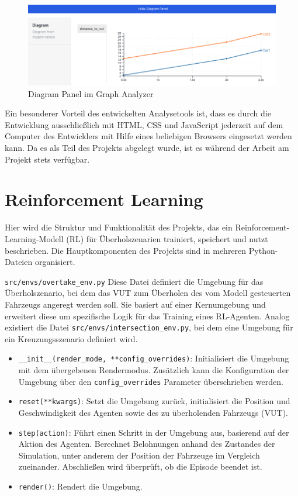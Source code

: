 \begin{figure}[htb]
    \centering
    \includegraphics[width=\textwidth]{contents/figures/diagram_panel.png}
    \caption{Diagram Panel im Graph Analyzer}
    \label{fig:analyzer_diagram_panel}
\end{figure}

Ein besonderer Vorteil des entwickelten Analysetools ist, dass es durch die Entwicklung ausschließlich mit HTML, CSS und JavaScript jederzeit auf dem Computer des Entwicklers mit Hilfe eines beliebigen Browsers eingesetzt werden kann. Da es als Teil des Projekts abgelegt wurde, ist es während der Arbeit am Projekt stets verfügbar.

\section{Reinforcement Learning}
Hier wird die Struktur und Funktionalität des Projekts, das ein Reinforcement-Learning-Modell (RL) für Überholszenarien trainiert, speichert und nutzt beschrieben. Die Hauptkomponenten des Projekts sind in mehreren Python-Dateien organisiert.

\texttt{src/envs/overtake\_env.py}
Diese Datei definiert die Umgebung für das Überholszenario, bei dem das VUT zum Überholen des vom Modell gesteuerten Fahrzeugs angeregt werden soll. Sie basiert auf einer Kernumgebung und erweitert diese um spezifische Logik für das Training eines RL-Agenten.
Analog existiert die Datei \texttt{src/envs/intersection\_env.py}, bei dem eine Umgebung für ein Kreuzungsszenario definiert wird.

\begin{itemize}
    \item \texttt{\_\_init\_\_(render\_mode, **config\_overrides)}: Initialisiert die Umgebung mit dem übergebenen Rendermodus. Zusätzlich kann die Konfiguration der Umgebung über den \texttt{config\_overrides} Parameter überschrieben werden.
    \item \texttt{reset(**kwargs)}: Setzt die Umgebung zurück, initialisiert die Position und Geschwindigkeit des Agenten sowie des zu überholenden Fahrzeugs (VUT).
    \item \texttt{step(action)}: Führt einen Schritt in der Umgebung aus, basierend auf der Aktion des Agenten. Berechnet Belohnungen anhand des Zustandes der Simulation, unter anderem der Position der Fahrzeuge im Vergleich zueinander. Abschließen wird überprüft, ob die Episode beendet ist. 
    \item \texttt{render()}: Rendert die Umgebung.
\end{itemize}

